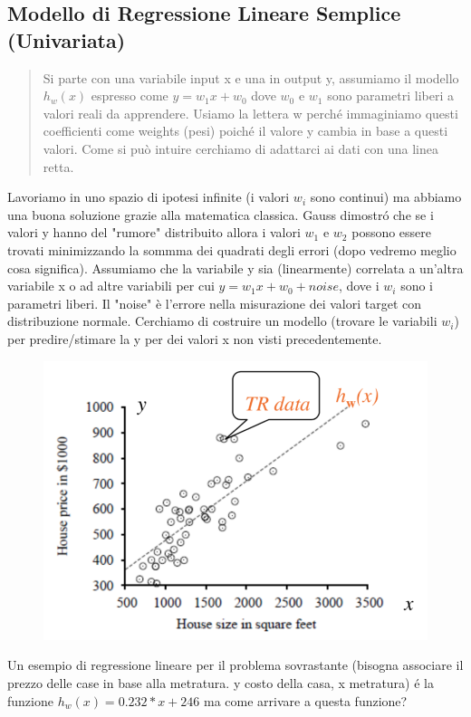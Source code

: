\documentclass{article}
\begin{document}
\subsection{Modello di Regressione Lineare Semplice (Univariata)}
\begin{quote}
    Si parte con una variabile input x e una in output y, assumiamo il modello $h_w(x)$ espresso come $y=w_1x+w_0$ dove $w_0$ e $w_1$ sono parametri liberi a valori reali da apprendere. Usiamo la lettera w perché immaginiamo questi coefficienti come weights (pesi) poiché il valore y cambia in base a questi valori. Come si può intuire cerchiamo di adattarci ai dati con una linea retta.
\end{quote}
Lavoriamo in uno spazio di ipotesi infinite (i valori $w_i$ sono continui) ma abbiamo una buona soluzione grazie alla matematica classica. Gauss dimostró che se i valori y hanno del "rumore" distribuito allora i valori $w_1$ e $w_2$ possono essere trovati minimizzando la sommma dei quadrati degli errori (dopo vedremo meglio cosa significa). \newline
Assumiamo che la variabile y sia (linearmente) correlata a un'altra variabile x o ad altre variabili per cui $y = w_1x + w_0 + noise$, dove i $w_i$ sono i parametri liberi. Il "noise" è l'errore nella misurazione dei valori target con distribuzione normale. Cerchiamo di costruire un modello (trovare le variabili $w_i$) per predire/stimare la y per dei valori x non visti precedentemente.
\begin{figure}[H]
    \centering
    \includegraphics[scale=0.5]{Images/regresslincase1.png}
\end{figure}
Un esempio di regressione lineare per il problema sovrastante (bisogna associare il prezzo delle case in base alla metratura. y costo della casa, x metratura) é la funzione $h_w(x)=0.232*x+246$ ma come arrivare a questa funzione?
\end{document}
